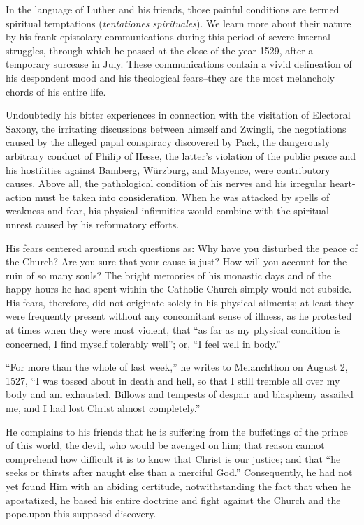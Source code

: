 In the language of Luther and his friends, those painful conditions
are termed spiritual temptations (\textit{tentationes spirituales}). We learn
more about their nature by his frank epistolary communications
during this period of severe internal struggles, through which he passed
at the close of the year 1529, after a temporary surcease in July.
These communications contain a vivid delineation of his despondent
mood and his theological fears--they are the most melancholy chords
of his entire life.

Undoubtedly his bitter experiences in connection with the visitation
of Electoral Saxony, the irritating discussions between himself and
Zwingli, the negotiations caused by the alleged papal conspiracy
discovered by Pack, the dangerously arbitrary conduct of Philip
of Hesse, the latter’s violation of the public peace and his hostilities
against Bamberg, Würzburg, and Mayence, were contributory causes.
Above all, the pathological condition of his nerves and his irregular
heart-action must be taken into consideration. When he was attacked
by spells of weakness and fear, his physical infirmities would
combine with the spiritual unrest caused by his reformatory efforts.

His fears centered around such questions as: Why have you disturbed
the peace of the Church? Are you sure that your cause is just? How
will you account for the ruin of so many souls? The bright memories
of his monastic days and of the happy hours he had spent within the
Catholic Church simply would not subside. His fears, therefore, did
not originate solely in his physical ailments; at least they were frequently
present without any concomitant sense of illness, as he protested
at times when they were most violent, that “as far as my physical
condition is concerned, I find myself tolerably well”; or, “I feel
well in body.”

“For more than the whole of last week,” he writes to Melanchthon
on August 2, 1527, “I was tossed about in death and hell, so that I
still tremble all over my body and am exhausted. Billows and
tempests of despair and blasphemy assailed me, and I had lost Christ
almost completely.”

He complains to his friends that he is suffering from the buffetings of the
prince of this world, the devil, who would be avenged on him; that reason
cannot comprehend how difficult it is to know that Christ is our justice;
and that “he seeks or thirsts after naught else than a merciful God.”
Consequently, he had not yet found Him with an abiding certitude, notwithstanding
the fact that when he apostatized, he based his entire doctrine and fight
against the Church and the pope.upon this supposed discovery.

